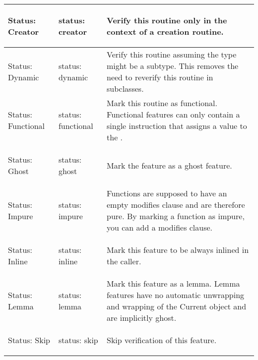 \begin{longtable}{|m{2.5cm}|l|m{6cm}|}
Status: \newline Creator &
{\begin{erunning}
status: creator
\end{erunning}} &
Verify this routine only in the context of a creation routine.
\\ \hline

Status: \newline Dynamic &
{\begin{erunning}
status: dynamic
\end{erunning}} &
Verify this routine assuming the \e{Current} type might be a subtype. This removes the need to reverify this routine in subclasses.
\\ \hline

Status: \newline Functional &
{\begin{erunning}
status: functional
\end{erunning}} &
Mark this routine as functional. Functional features can only contain a single instruction that assigns a value to the \e{Result}.
\\ \hline

Status: \newline Ghost &
{\begin{erunning}
status: ghost
\end{erunning}} &
Mark the feature as a ghost feature.
\\ \hline

Status: \newline Impure &
{\begin{erunning}
status: impure
\end{erunning}} &
Functions are supposed to have an empty modifies clause and are therefore pure. By marking a function as impure, you can add a modifies clause.
\\ \hline

Status: \newline Inline &
{\begin{erunning}
status: inline
\end{erunning}} &
Mark this feature to be always inlined in the caller.
\\ \hline

Status: \newline Lemma &
{\begin{erunning}
status: lemma
\end{erunning}} &
Mark this feature as a lemma. Lemma features have no automatic unwrapping and wrapping of the Current object and are implicitly ghost.
\\ \hline

Status: \newline Skip &
{\begin{erunning}
status: skip
\end{erunning}} &
Skip verification of this feature.
\\ \hline

\end{longtable}
	

